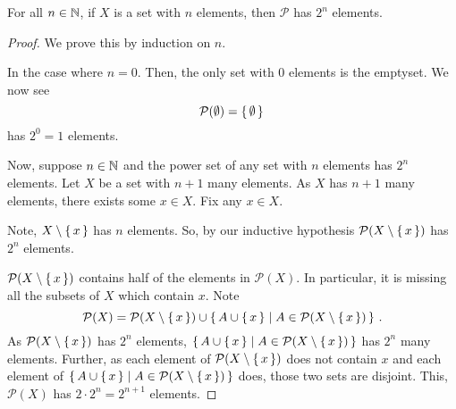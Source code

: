 \guard





\begin{prop}
\label{prop:sizeOfFinitePowerset}
  For all $n\in\mathbb{N}$, if $X$ is a set with $n$ elements, then $\mathcal{P}$ has $2^n$ elements.
\end{prop}
\begin{proof}
  We prove this by induction on $n$.

  In the case where $n=0$.
  Then, the only set with $0$ elements is the emptyset.
  We now see \[\mathcal{P}(\emptyset) = \left\{\,\emptyset\,\right\} \,\] has $2^0=1$ elements.

  Now, suppose $n\in\mathbb{N}$ and the power set of any set with $n$ elements has  $2^n$ elements.
  Let $X$ be a set with $n+1$ many elements.
  As $X$ has $n+1$ many elements, there exists some $x\in X$.
  Fix any $x\in X$.

  Note, $X\setminus\left\{\,x\,\right\}$ has $n$ elements.
  So, by our inductive hypothesis $\mathcal{P}(X\setminus\left\{\,x\,\right\})$ has $2^n$ elements.

  $\mathcal{P}(X\setminus\left\{\,x\,\right\})$ contains half of the elements in $\mathcal{P}(X)$.
  In particular, it is missing all the subsets of $X$ which contain $x$.
  Note \[ \mathcal{P}(X) = \mathcal{P}(X\setminus\left\{\,x\,\right\}) \cup \left\{\, A\cup\left\{\,x\,\right\} \mid A\in \mathcal{P}(X\setminus\left\{\,x\,\right\}) \,\right\}\,.\]
  As $\mathcal{P}(X\setminus\left\{\,x\,\right\})$ has $2^n$ elements, $\left\{\, A\cup\left\{\,x\,\right\} \mid A\in \mathcal{P}(X\setminus\left\{\,x\,\right\}) \,\right\}$ has $2^n$ many elements.
  Further, as each element of $\mathcal{P}(X\setminus\left\{\,x\,\right\})$ does not contain $x$ and each element of $\left\{\, A\cup\left\{\,x\,\right\} \mid A\in \mathcal{P}(X\setminus\left\{\,x\,\right\}) \,\right\}$ does, those two sets are disjoint.
  This, $\mathcal{P}(X)$ has $2\cdot 2^n=2^{n+1}$ elements.
\end{proof}
